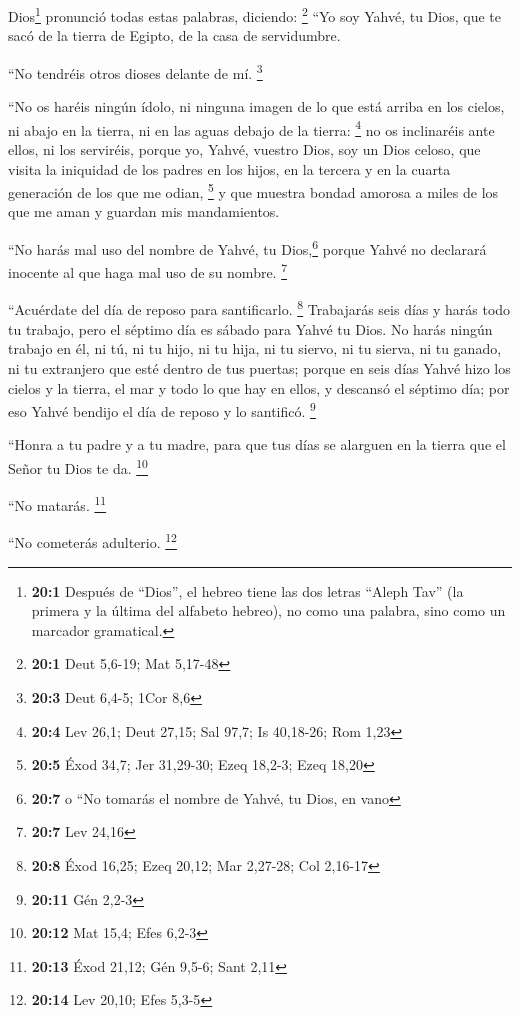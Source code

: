  Dios\footnote{\textbf{20:1} Después de ``Dios'', el
  hebreo tiene las dos letras ``Aleph Tav'' (la primera y la última del
  alfabeto hebreo), no como una palabra, sino como un marcador
  gramatical.} pronunció todas estas palabras, diciendo: \footnote{\textbf{20:1}
  Deut 5,6-19; Mat 5,17-48}  ``Yo soy Yahvé, tu Dios, que
te sacó de la tierra de Egipto, de la casa de servidumbre.

 ``No tendréis otros dioses delante de mí. \footnote{\textbf{20:3}
  Deut 6,4-5; 1Cor 8,6}

 ``No os haréis ningún ídolo, ni ninguna imagen de lo que
está arriba en los cielos, ni abajo en la tierra, ni en las aguas debajo
de la tierra: \footnote{\textbf{20:4} Lev 26,1; Deut 27,15; Sal 97,7; Is
  40,18-26; Rom 1,23}  no os inclinaréis ante ellos, ni
los serviréis, porque yo, Yahvé, vuestro Dios, soy un Dios celoso, que
visita la iniquidad de los padres en los hijos, en la tercera y en la
cuarta generación de los que me odian, \footnote{\textbf{20:5} Éxod
  34,7; Jer 31,29-30; Ezeq 18,2-3; Ezeq 18,20}  y que
muestra bondad amorosa a miles de los que me aman y guardan mis
mandamientos.

 ``No harás mal uso del nombre de Yahvé, tu
Dios,\footnote{\textbf{20:7} o ``No tomarás el nombre de Yahvé, tu Dios,
  en vano} porque Yahvé no declarará inocente al que haga mal uso de su
nombre. \footnote{\textbf{20:7} Lev 24,16}

 ``Acuérdate del día de reposo para santificarlo.
\footnote{\textbf{20:8} Éxod 16,25; Ezeq 20,12; Mar 2,27-28; Col 2,16-17}
 Trabajarás seis días y harás todo tu trabajo,
 pero el séptimo día es sábado para Yahvé tu Dios. No
harás ningún trabajo en él, ni tú, ni tu hijo, ni tu hija, ni tu siervo,
ni tu sierva, ni tu ganado, ni tu extranjero que esté dentro de tus
puertas;  porque en seis días Yahvé hizo los cielos y la
tierra, el mar y todo lo que hay en ellos, y descansó el séptimo día;
por eso Yahvé bendijo el día de reposo y lo santificó. \footnote{\textbf{20:11}
  Gén 2,2-3}

 ``Honra a tu padre y a tu madre, para que tus días se
alarguen en la tierra que el Señor tu Dios te da. \footnote{\textbf{20:12}
  Mat 15,4; Efes 6,2-3}

 ``No matarás. \footnote{\textbf{20:13} Éxod 21,12; Gén
  9,5-6; Sant 2,11}

 ``No cometerás adulterio. \footnote{\textbf{20:14} Lev
  20,10; Efes 5,3-5}

